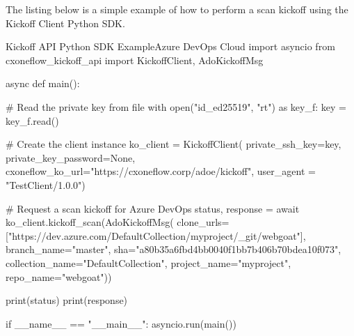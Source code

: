 The listing below is a simple example of how to perform a scan kickoff using
the Kickoff Client Python SDK.


\begin{code}{Kickoff API Python SDK Example}{Azure DevOps Cloud}{}
import asyncio
from cxoneflow_kickoff_api import KickoffClient, AdoKickoffMsg

async def main():

  # Read the private key from file
  with open("id_ed25519", "rt") as key_f:
    key = key_f.read()

  # Create the client instance
  ko_client = KickoffClient(
    private_ssh_key=key,
    private_key_password=None,
    cxoneflow_ko_url="https://cxoneflow.corp/adoe/kickoff",
    user_agent = "TestClient/1.0.0")

  # Request a scan kickoff for Azure DevOps  
  status, response = await ko_client.kickoff_scan(AdoKickoffMsg(
    clone_urls=["https://dev.azure.com/DefaultCollection/myproject/_git/webgoat"], 
    branch_name="master", 
    sha="a80b35a6fbd4bb0040f1bb7b406b70bdea10f073", 
    collection_name="DefaultCollection",
    project_name="myproject", 
    repo_name="webgoat"))

  print(status)
  print(response)

if __name__ == "__main__":
  asyncio.run(main())  

\end{code}